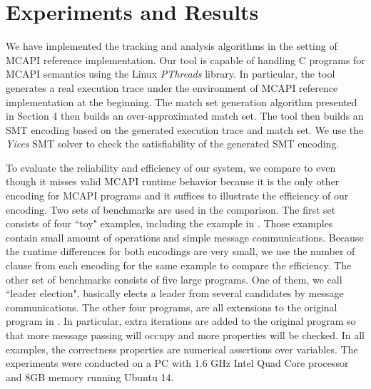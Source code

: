 \section{Experiments and Results}
We have implemented the tracking and analysis algorithms in the setting of MCAPI reference implementation. Our tool is capable of handling C programs for MCAPI semantics using the Linux \textit{PThreads} library. In particular, the tool generates a real execution trace under the environment of MCAPI reference implementation at the beginning. The match set generation algorithm presented in Section 4 then builds an over-approximated match set. The tool then builds an SMT encoding based on the generated execution trace and match set. We use the \textit{Yices} SMT solver \cite{dutertre:CAV06} to check the satisfiability of the generated SMT encoding. 

To evaluate the reliability and efficiency of our system, we compare to \cite{elwakil:padtad10} even though it misses valid MCAPI runtime behavior because it is the only other encoding for MCAPI programs and it suffices to illustrate the efficiency of our encoding. Two sets of benchmarks are used in the comparison. The first set consists of four ``toy" examples, including the example in . Those examples contain small amount of operations and simple message communications. Because the runtime differences for both encodings are very small, we use the number of clause from each encoding for the same example to compare the efficiency. The other set of benchmarks consists of five large programs. One of them, we call ``leader election", basically elects a leader from several candidates by message communications. The other four programs, are all extensions to the original program in . In particular, extra iterations are added to the original program so that more message passing will occupy and more properties will be checked. In all examples, the correctness
properties are numerical assertions over variables. The experiments were conducted on a PC with 1.6 GHz Intel Quad Core processor and 8GB memory running Ubuntu 14.   

